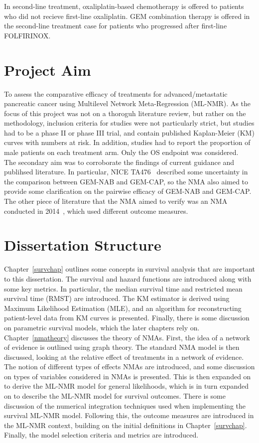 In second-line treatment, oxaliplatin-based chemotherapy is offered to patients who did not recieve first-line oxaliplatin. GEM combination therapy is offered in the second-line treatment case for patients who progressed after first-line FOLFIRINOX.

\section{Project Aim}\label{sec:aims}
To assess the comparative efficacy of treatments for advanced/metastatic pancreatic cancer using Multilevel Network Meta-Regression (ML-NMR). As the focus of this project was not on a thoroguh literature review, but rather on the methodology, inclusion criteria for studies were not particularly strict, but studies had to be a phase II or phase III trial, and contain published Kaplan-Meier (KM) curves with numbers at risk. In addition, studies had to report the proportion of male patients on each treatment arm. Only the OS endpoint was considered. \\

The secondary aim was to corroborate the findings of current guidance and publihsed literature. In particular, NICE TA476~\cite{TA476} described some uncertainty in the comparison between GEM-NAB and GEM-CAP, so the NMA also aimed to provide some clarification on the pairwise efficacy of GEM-NAB and GEM-CAP. The other piece of literature that the NMA aimed to verify was an NMA conducted in 2014~\cite{gresham2014}, which used different outcome measures. 

\section{Dissertation Structure}
Chapter~\ref{survchap} outlines some concepts in survival analysis that are important to this dissertation. The survival and hazard functions are introduced along with some key metrics. In particular, the median survival time and restricted mean survival time (RMST) are introduced. The KM estimator is derived using Maximum Likelihood Estimation (MLE), and an algorithm for reconstructing patient-level data from KM curves is presented. Finally, there is some discussion on parametric survival models, which the later chapters rely on. \\

Chapter~\ref{nmatheory} discusses the theory of NMAs. First, the idea of a network of evidence is outlined using graph theory. The standard NMA model is then discussed, looking at the relative effect of treatments in a network of evidence. The notion of different types of effects NMAs are introduced, and some discussion on types of variables considered in NMAs is presented. This is then expanded on to derive the ML-NMR model for general likelihoods, which is in turn expanded on to describe the ML-NMR model for survival outcomes. There is some discussion of the numerical integration techniques used when implementing the survival ML-NMR model. Following this, the outcome measures are introduced in the ML-NMR context, building on the initial definitions in Chapter~\ref{survchap}. Finally, the model selection criteria and metrics are introduced. \\

